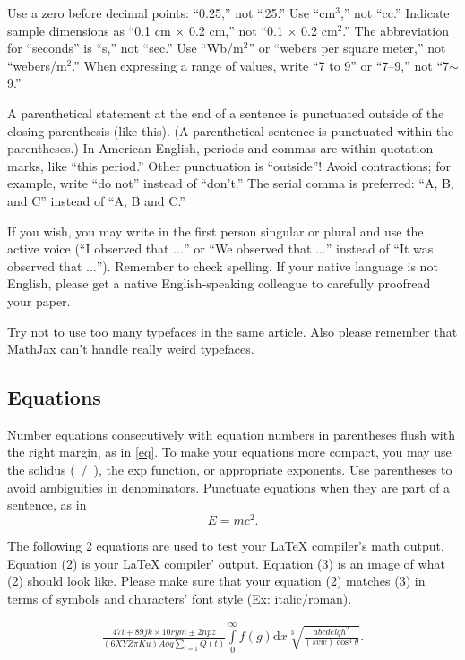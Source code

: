 \documentclass{ieeeaccess}
\begin{document}
Use a zero before decimal points: ``0.25,'' not ``.25.'' Use
``cm$^{3}$,'' not ``cc.'' Indicate sample dimensions as ``0.1 cm
$\times $ 0.2 cm,'' not ``0.1 $\times $ 0.2 cm$^{2}$.'' The
abbreviation for ``seconds'' is ``s,'' not ``sec.'' Use
``Wb/m$^{2}$'' or ``webers per square meter,'' not
``webers/m$^{2}$.'' When expressing a range of values, write ``7 to
9'' or ``7--9,'' not ``7$\sim $9.''

A parenthetical statement at the end of a sentence is punctuated outside of
the closing parenthesis (like this). (A parenthetical sentence is punctuated
within the parentheses.) In American English, periods and commas are within
quotation marks, like ``this period.'' Other punctuation is ``outside''!
Avoid contractions; for example, write ``do not'' instead of ``don't.'' The
serial comma is preferred: ``A, B, and C'' instead of ``A, B and C.''

If you wish, you may write in the first person singular or plural and use
the active voice (``I observed that $\ldots$'' or ``We observed that $\ldots$''
instead of ``It was observed that $\ldots$''). Remember to check spelling. If
your native language is not English, please get a native English-speaking
colleague to carefully proofread your paper.

Try not to use too many typefaces in the same article. Also please remember that MathJax
can't handle really weird typefaces.

\subsection{Equations}
Number equations consecutively with equation numbers in parentheses flush
with the right margin, as in \eqref{eq}. To make your equations more
compact, you may use the solidus (~/~), the exp function, or appropriate
exponents. Use parentheses to avoid ambiguities in denominators. Punctuate
equations when they are part of a sentence, as in
\begin{equation}E=mc^2.\label{eq}\end{equation}

The following 2 equations are used to test
your LaTeX compiler's math output. Equation (2) is your LaTeX compiler' output. Equation (3) is an image of what (2) should look like.
Please make sure that your equation (2) matches (3) in terms of symbols and characters' font style (Ex: italic/roman).

\begin{align*} \frac{47i+89jk\times 10rym \pm 2npz }{(6XYZ\pi Ku) Aoq \sum _{i=1}^{r} Q(t)} {\int\limits_0^\infty \! f(g)\mathrm{d}x}  \sqrt[3]{\frac{abcdelqh^2}{ (svw) \cos^3\theta }} . \tag{2}\end{align*}
\end{document}

